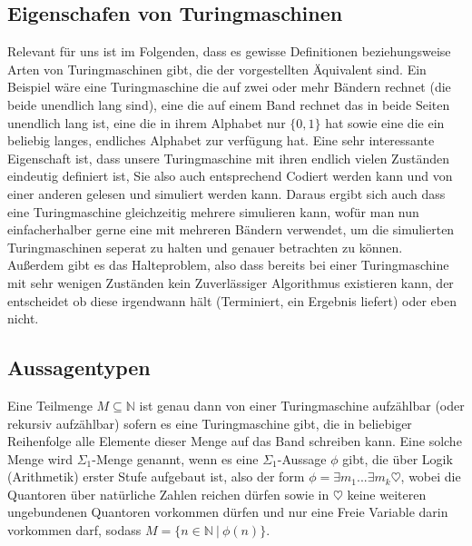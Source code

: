 \documentclass{scrartcl}
\begin{document}
\subsection{Eigenschafen von Turingmaschinen}
Relevant für uns ist im Folgenden, dass es gewisse Definitionen beziehungsweise
Arten von Turingmaschinen gibt, die der vorgestellten Äquivalent sind. Ein
Beispiel wäre eine Turingmaschine die auf zwei oder mehr Bändern rechnet
(die beide unendlich lang sind), eine die auf einem Band rechnet das in beide
Seiten unendlich lang ist, eine die in ihrem Alphabet nur $\{0, 1\}$ hat sowie
eine die ein beliebig langes, endliches Alphabet zur verfügung hat. Eine sehr
interessante Eigenschaft ist, dass unsere Turingmaschine mit ihren endlich
vielen Zuständen eindeutig definiert ist, Sie also auch entsprechend Codiert
werden kann und von einer anderen gelesen und simuliert werden kann. Daraus
ergibt sich auch dass eine Turingmaschine gleichzeitig mehrere simulieren kann,
wofür man nun einfacherhalber gerne eine mit mehreren Bändern verwendet, um die
simulierten Turingmaschinen seperat zu halten und genauer betrachten zu können. \\
Außerdem gibt es das Halteproblem, also dass bereits bei einer Turingmaschine
mit sehr wenigen Zuständen kein Zuverlässiger Algorithmus existieren kann, der
entscheidet ob diese irgendwann hält (Terminiert, ein Ergebnis liefert) oder
eben nicht.


\subsection{Aussagentypen}
Eine Teilmenge $M \subseteq \mathbb{N}$ ist genau dann von einer Turingmaschine
aufzählbar (oder rekursiv aufzählbar) sofern es eine Turingmaschine gibt, die
in beliebiger Reihenfolge alle Elemente dieser Menge auf das Band schreiben
kann. Eine solche Menge wird $\Sigma_1$-Menge genannt, wenn es eine
$\Sigma_1$-Aussage $\phi$ gibt, die über Logik (Arithmetik) erster Stufe
aufgebaut ist, also der form $\phi = \exists m_1...\exists m_k \heartsuit$,
wobei die Quantoren über natürliche Zahlen reichen dürfen sowie in $\heartsuit$
keine weiteren ungebundenen Quantoren vorkommen dürfen und nur eine Freie
Variable darin vorkommen darf, sodass $M = \{n \in \mathbb{N}\ |\ \phi(n)\}$.
\end{document}
